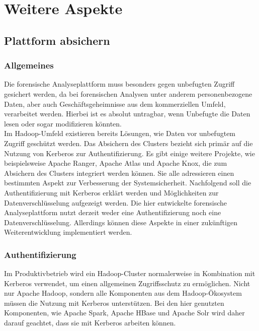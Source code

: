 \chapter{Weitere Aspekte}
\label{ch:additional_aspects}

\section{Plattform absichern}
\label{sec:secure_platform}
\subsection{Allgemeines}
Die forensische Analyseplattform muss besonders gegen unbefugten Zugriff gesichert werden, da bei forensischen Analysen unter anderem personenbezogene Daten, aber auch Geschäftsgeheimnisse aus dem kommerziellen Umfeld, verarbeitet werden. Hierbei ist es absolut untragbar, wenn Unbefugte die Daten lesen oder sogar modifizieren könnten.\\

\noindent
Im Hadoop-Umfeld existieren bereits Lösungen, wie Daten vor unbefugtem Zugriff geschützt werden. Das Absichern des Clusters bezieht sich primär auf die Nutzung von Kerberos zur Authentifizierung. Es gibt einige weitere Projekte, wie beispielsweise Apache Ranger, Apache Atlas und Apache Knox, die zum Absichern des Clusters integriert werden können. Sie alle adressieren einen bestimmten Aspekt zur Verbesserung der Systemsicherheit. Nachfolgend soll die Authentifizierung mit Kerberos erklärt werden und Möglichkeiten zur Datenverschlüsselung aufgezeigt werden. Die hier entwickelte forensische Analyseplattform nutzt derzeit weder eine Authentifizierung noch eine Datenverschlüsselung. Allerdings können diese Aspekte in einer zukünftigen Weiterentwicklung implementiert werden.

\subsection{Authentifizierung}

Im Produktivbetrieb wird ein Hadoop-Cluster normalerweise in Kombination mit Kerberos verwendet, um einen allgemeinen Zugriffsschutz zu ermöglichen.\cite{hadoop_security} Nicht nur Apache Hadoop, sondern alle Komponenten aus dem Hadoop-Ökosystem müssen die Nutzung mit Kerberos unterstützen. Bei den hier genutzten Komponenten, wie Apache Spark, Apache HBase und Apache Solr wird daher darauf geachtet, dass sie mit Kerberos arbeiten können.\\

